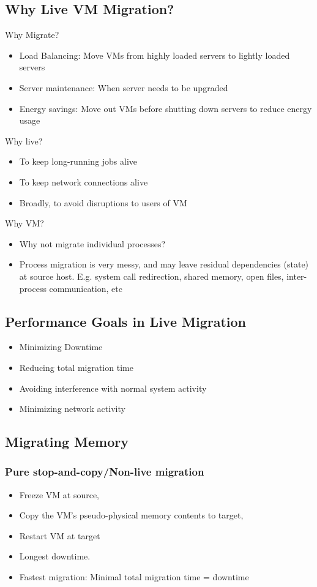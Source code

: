\documentclass[12pt]{article}
\begin{document}
\subsection{Why Live VM Migration?}
Why Migrate?
\begin{itemize}
    \item Load Balancing: Move VMs from highly loaded servers to lightly loaded servers
    \item Server maintenance: When server needs to be upgraded
    \item Energy savings: Move out VMs before shutting down servers to reduce energy usage
\end{itemize}
Why live?
\begin{itemize}
    \item To keep long-running jobs alive 
    \item To keep network connections alive
    \item Broadly, to avoid disruptions to users of VM
\end{itemize}
Why VM?
\begin{itemize}
    \item Why not migrate individual processes?
    \item Process migration is very messy, and may leave residual dependencies (state) at source host. E.g. system call redirection, shared memory, open files, inter-process communication, etc
\end{itemize}
\subsection{Performance Goals in Live Migration}
\begin{itemize}
    \item Minimizing Downtime
    \item Reducing total migration time
    \item Avoiding interference with normal system activity
    \item Minimizing network activity
\end{itemize}
\subsection{Migrating Memory}
\subsubsection{Pure stop-and-copy/Non-live migration}
\begin{itemize}
    \item Freeze VM at source, 
    \item Copy the VM's pseudo-physical memory contents to target, 
    \item Restart VM at target
    \item Longest downtime.
    \item Fastest migration: Minimal total migration time = downtime
\end{itemize}
\end{document}
